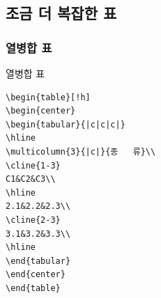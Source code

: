 \documentclass{beamer}
\begin{document}


\subsection{조금 더 복잡한 표}

\subsubsection{열병합 표}

\begin{frame}[fragile]
\begin{block}{열병합 표}
\small
\begin{verbatim}
\begin{table}[!h]
\begin{center}
\begin{tabular}{|c|c|c|}
\hline
\multicolumn{3}{|c|}{종   류}\\
\cline{1-3}
C1&C2&C3\\
\hline
2.1&2.2&2.3\\
\cline{2-3}
3.1&3.2&3.3\\
\hline
\end{tabular}
\end{center}
\end{table}
\end{verbatim}
\end{block}
\end{frame}
\end{document}

